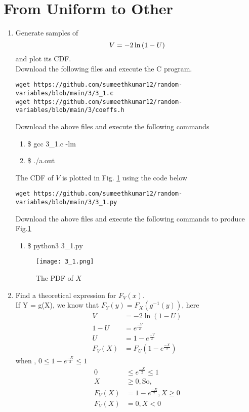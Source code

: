 \documentclass[journal,12pt,twocolumn]{IEEEtran}
\begin{document}
\section{From Uniform to Other}
\begin{enumerate}[label=\thesection.\arabic*
,ref=\thesection.\theenumi]
%
\item
Generate samples of 
%
\begin{equation}
V = -2\ln\left(1-U\right)
\end{equation}
%
and plot its CDF.  \\
\solution Download the following files and execute the  C program.
\begin{lstlisting}
wget https://github.com/sumeethkumar12/random-variables/blob/main/3/3_1.c
wget https://github.com/sumeethkumar12/random-variables/blob/main/3/coeffs.h
\end{lstlisting}
Download the above files and execute the following commands
\begin{enumerate}
    \item \$ gcc 3\_1.c -lm
    \item \$ ./a.out
    \end{enumerate}
The CDF of $V$ is plotted in Fig. \ref{fig:3.1} using the code below
\begin{lstlisting}
wget https://github.com/sumeethkumar12/random-variables/blob/main/3/3_1.py
\end{lstlisting}
Download the above files and execute the following commands to produce Fig.\ref{fig:3.1}
\begin{enumerate}
    \item \$ python3 3\_1.py
\end{enumerate}
\begin{figure}[!h]
\centering
\texttt{[image: 3\_1.png]}\\
\caption{The PDF of $X$}
\label{fig:3.1}
\end{figure}
\item Find a theoretical expression for $F_V(x)$.\\
\solution
If Y = g(X), we know that $F_Y(y) = F_X(g^{-1}(y))$, here 
\begin{align}
V &= -2\ln{(1-U)} \\
1-U &= e^{\frac{-V}{2}}\\
U &= 1 - e^{\frac{-V}{2}} \\ 
F_V(X) &= F_U(1 - e^{\frac{-X}{2}}) 
\end{align}
 when , $0 \le 1 - e^{\frac{-X}{2}} \le 1$
 \begin{align}
 0 &\le e^{\frac{-X}{2}} \le 1 \\
  X &\ge 0 , \text{So,} \\ 
  F_V(X) &= 1 - e^{\frac{-X}{2}}, X \ge 0 \\
  F_V(X) &= 0 , X < 0 
 \end{align}
\end{enumerate}
\end{document}
